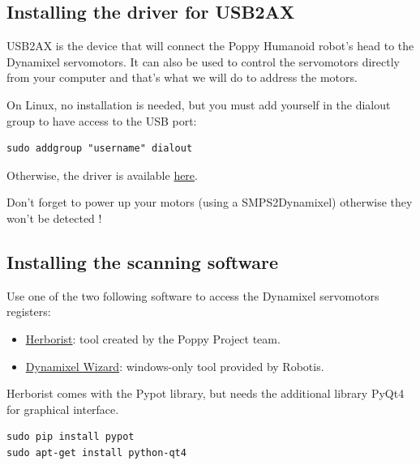 \documentclass[includefoot]{article}
\begin{document}
\subsection{Installing the driver for USB2AX}

USB2AX is the device that will connect the Poppy Humanoid robot's head to the Dynamixel servomotors. It can also be used to control the servomotors directly from your computer and that's what we will do to address the motors.

On Linux, no installation is needed, but you must add yourself in the dialout group to have access to the USB port:
 \begin{verbatim}
sudo addgroup "username" dialout
\end{verbatim}

Otherwise, the driver is available \href{http://www.xevelabs.com/doku.php?id=product:usb2ax:quickstart}{here}.

Don't forget to power up your motors (using a SMPS2Dynamixel) otherwise they won't be detected !

\subsection{Installing the scanning software}

Use one of the two following software to access the Dynamixel servomotors registers:

\begin{itemize}
\item \href{http://poppy-project.github.io/pypot/herborist.html}{Herborist}: tool created by the Poppy Project team. 
\item \href{http://support.robotis.com/en/software/roboplus/dynamixel_monitor/quickstart/dynamixel\_monitor\_connection.htm}{Dynamixel Wizard}: windows-only tool provided by Robotis.
\end{itemize}

Herborist comes with the Pypot library, but needs the additional library PyQt4 for graphical interface.
\begin{verbatim}
sudo pip install pypot
sudo apt-get install python-qt4
\end{verbatim}
\end{document}
